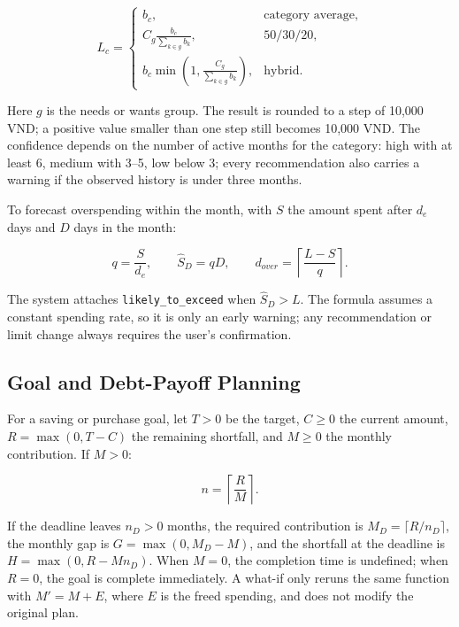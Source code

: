 \begin{equation}
  L_c=
  \left\{
  \begin{array}{ll}
    b_c,
      & \mbox{category average},\\
    C_g\displaystyle\frac{b_c}{\sum_{k\in g}b_k},
      & \mbox{50/30/20},\\
    b_c\displaystyle\min\left(1,\frac{C_g}{\sum_{k\in g}b_k}\right),
      & \mbox{hybrid}.
  \end{array}
  \right.
\end{equation}

Here $g$ is the needs or wants group. The result is rounded to a step of
10,000 VND; a positive value smaller than one step still becomes 10,000
VND. The confidence depends on the number of active months for the
category: high with at least 6, medium with 3--5, low below 3; every
recommendation also carries a warning if the observed history is under
three months.

To forecast overspending within the month, with $S$ the amount spent
after $d_e$ days and $D$ days in the month:

\begin{equation}
  q=\frac{S}{d_e},\qquad \widehat S_D=qD,\qquad
  d_{over}=\left\lceil\frac{L-S}{q}\right\rceil.
\end{equation}

The system attaches \texttt{likely\_to\_exceed} when $\widehat S_D>L$.
The formula assumes a constant spending rate, so it is only an early
warning; any recommendation or limit change always requires the user's
confirmation.

\subsection{Goal and Debt-Payoff Planning}

For a saving or purchase goal, let $T>0$ be the target, $C\geq0$ the
current amount, $R=\max(0,T-C)$ the remaining shortfall, and $M\geq0$
the monthly contribution. If $M>0$:

\begin{equation}
  n=\left\lceil\frac{R}{M}\right\rceil.
\end{equation}

If the deadline leaves $n_D>0$ months, the required contribution is
$M_D=\lceil R/n_D\rceil$, the monthly gap is $G=\max(0,M_D-M)$, and the
shortfall at the deadline is $H=\max(0,R-Mn_D)$. When $M=0$, the
completion time is undefined; when $R=0$, the goal is complete
immediately. A what-if only reruns the same function with $M'=M+E$,
where $E$ is the freed spending, and does not modify the original plan.

